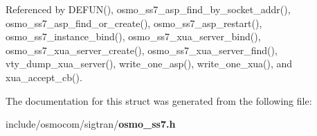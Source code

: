 Referenced by D\+E\+F\+U\+N(), osmo\+\_\+ss7\+\_\+asp\+\_\+find\+\_\+by\+\_\+socket\+\_\+addr(), osmo\+\_\+ss7\+\_\+asp\+\_\+find\+\_\+or\+\_\+create(), osmo\+\_\+ss7\+\_\+asp\+\_\+restart(), osmo\+\_\+ss7\+\_\+instance\+\_\+bind(), osmo\+\_\+ss7\+\_\+xua\+\_\+server\+\_\+bind(), osmo\+\_\+ss7\+\_\+xua\+\_\+server\+\_\+create(), osmo\+\_\+ss7\+\_\+xua\+\_\+server\+\_\+find(), vty\+\_\+dump\+\_\+xua\+\_\+server(), write\+\_\+one\+\_\+asp(), write\+\_\+one\+\_\+xua(), and xua\+\_\+accept\+\_\+cb().



The documentation for this struct was generated from the following file\+:\begin{DoxyCompactItemize}
\item 
include/osmocom/sigtran/{\bf osmo\+\_\+ss7.\+h}\end{DoxyCompactItemize}
